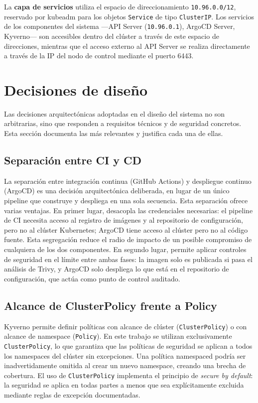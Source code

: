 La \textbf{capa de servicios} utiliza el espacio de direccionamiento \texttt{10.96.0.0/12}, reservado por kubeadm para los objetos \texttt{Service} de tipo \texttt{ClusterIP}. Los servicios de los componentes del sistema —API Server (\texttt{10.96.0.1}), ArgoCD Server, Kyverno— son accesibles dentro del clúster a través de este espacio de direcciones, mientras que el acceso externo al API Server se realiza directamente a través de la IP del nodo de control mediante el puerto 6443.

\section{Decisiones de diseño}
\label{sec:decisiones}

Las decisiones arquitectónicas adoptadas en el diseño del sistema no son arbitrarias, sino que responden a requisitos técnicos y de seguridad concretos. Esta sección documenta las más relevantes y justifica cada una de ellas.

\subsection{Separación entre CI y CD}

La separación entre integración continua (GitHub Actions) y despliegue continuo (ArgoCD) es una decisión arquitectónica deliberada, en lugar de un único pipeline que construye y despliega en una sola secuencia. Esta separación ofrece varias ventajas. En primer lugar, desacopla las credenciales necesarias: el pipeline de CI necesita acceso al registro de imágenes y al repositorio de configuración, pero no al clúster Kubernetes; ArgoCD tiene acceso al clúster pero no al código fuente. Esta segregación reduce el radio de impacto de un posible compromiso de cualquiera de los dos componentes. En segundo lugar, permite aplicar controles de seguridad en el límite entre ambas fases: la imagen solo es publicada si pasa el análisis de Trivy, y ArgoCD solo despliega lo que está en el repositorio de configuración, que actúa como punto de control auditado.

\subsection{Alcance de ClusterPolicy frente a Policy}

Kyverno permite definir políticas con alcance de clúster (\texttt{ClusterPolicy}) o con alcance de namespace (\texttt{Policy}). En este trabajo se utilizan exclusivamente \texttt{ClusterPolicy}, lo que garantiza que las políticas de seguridad se aplican a todos los namespaces del clúster sin excepciones. Una política namespaced podría ser inadvertidamente omitida al crear un nuevo namespace, creando una brecha de cobertura. El uso de \texttt{ClusterPolicy} implementa el principio de \textit{secure by default}: la seguridad se aplica en todas partes a menos que sea explícitamente excluida mediante reglas de excepción documentadas.

